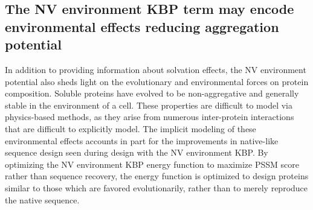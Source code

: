 \subsection{The \acs{NV} environment \acs{KBP} term may encode environmental effects reducing aggregation potential}
In addition to providing information about solvation effects, the \ac{NV} environment potential also sheds light on the evolutionary and environmental forces on protein composition.
Soluble proteins have evolved to be non-aggregative and generally stable in the environment of a cell.
These properties are difficult to model via physics-based methods, as they arise from numerous inter-protein interactions that are difficult to explicitly model.
The implicit modeling of these environmental effects accounts in part for the improvements in native-like sequence design seen during design with the \ac{NV} environment \ac{KBP}.
By optimizing the \ac{NV} environment \ac{KBP} energy function to maximize \ac{PSSM} score rather than sequence recovery, the energy function is optimized to design proteins similar to those which are favored evolutionarily, rather than to merely reproduce the native sequence.
